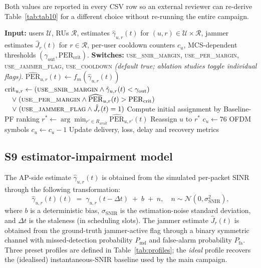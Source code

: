 \documentclass[journal,onecolumn,11pt,a4paper]{IEEEtran}
\newcommand{\snir}{\mathrm{SNIR}}
\newcommand{\percrit}{\mathrm{PER}_{\mathrm{crit}}}
\newcommand{\gout}{\gamma_{\mathrm{out}}}
\newcommand{\snirhat}[2]{\hat\gamma_{#1,#2}(t)}
\newcommand{\jhat}[1]{\hat{J}_{#1}(t)}
\newcommand{\perhat}[2]{\widehat{\mathrm{PER}}_{#1,#2}(t)}
\begin{document}
Both values are reported in every CSV row so an external reviewer
can re-derive Table~\ref{tab:tab10} for a different choice without
re-running the entire campaign.

\begin{algorithm}[t]
  \caption{\textsc{Realloc/S9} AP-side scheduler with ablation
  switches.}
  \label{alg:s9}
  \begin{algorithmic}[1]
    \State \textbf{Input:} users $\mathcal{U}$, RUs $\mathcal{R}$,
      estimates $\snirhat{u}{r}$ for $(u,r)\in\mathcal{U}\times\mathcal{R}$,
      jammer estimates $\jhat{r}$ for $r \in \mathcal{R}$, per-user
      cooldown counters $c_u$, MCS-dependent thresholds
      $(\gout,\percrit)$.
    \State \textbf{Switches:} \textsc{use\_snir\_margin},
      \textsc{use\_per\_margin}, \textsc{use\_jammer\_flag},
      \textsc{use\_cooldown} \emph{(default true; ablation studies
      toggle individual flags)}.
        \State $\perhat{u}{r} \gets f_m(\snirhat{u}{r})$
        \State $\mathrm{crit}_{u,r} \gets
          (\textsc{use\_snir\_margin}\wedge \snirhat{u}{r}<\gout)$
        \State $\quad \vee\;(\textsc{use\_per\_margin}\wedge\perhat{u}{r}>\percrit)$
        \State $\quad \vee\;(\textsc{use\_jammer\_flag}\wedge \jhat{r}=1)$
      \EndFor
      \State Compute initial assignment by Baseline-PF ranking
          \State $r^* \gets \arg\min_{r'\in R_{\mathrm{avail}}}
            \perhat{u}{r'}$
          \If{$\perhat{u}{r^*} < \perhat{u}{r}$}
            \State Reassign $u$ to $r^*$
              \State $c_u \gets 76$ OFDM symbols
            \EndIf
          \EndIf
          \State $c_u \gets c_u - 1$
        \EndIf
      \EndFor
      \State Update delivery, loss, delay and recovery metrics
    \EndFor
  \end{algorithmic}
\end{algorithm}

\subsection{S9 estimator-impairment model}
\label{sec:s9-estimator}

The AP-side estimate $\snirhat{u}{r}$ is obtained from the simulated
per-packet SINR through the following transformation:
\begin{equation}
  \snirhat{u}{r}(t) \;=\;
  \gamma_{u,r}(t-\Delta t) \;+\; b \;+\; n,
  \quad n \sim \mathcal{N}(0,\sigma_{\snir}^2),
  \label{eq:s9-est}
\end{equation}
where $b$ is a deterministic bias, $\sigma_{\snir}$ is the
estimation-noise standard deviation, and $\Delta t$ is the staleness
(in scheduling slots). The jammer estimate $\jhat{r}$ is obtained
from the ground-truth jammer-active flag through a binary symmetric
channel with missed-detection probability $P_{\mathrm{md}}$ and
false-alarm probability $P_{\mathrm{fa}}$. Three preset profiles are
defined in Table~\ref{tab:profiles}; the \emph{ideal} profile
recovers the (idealised) instantaneous-SNIR baseline used by the
main campaign.
\end{document}
